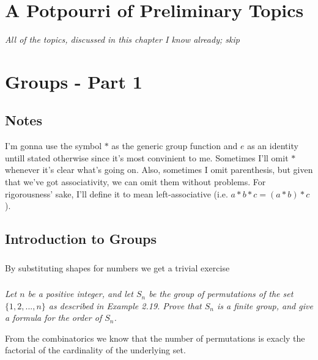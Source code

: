 \documentclass[11pt,oneside,titlepage]{book}
\newcommand{\set}[1]{\{ #1 \}}
\begin{document}
\chapter{A Potpourri of Preliminary Topics}

\textit{All of the topics, discussed in this chapter I know already; skip}

\chapter{Groups - Part 1}

\section*{Notes}

I'm gonna use the symbol $*$ as the generic group function and $e$ as
an identity untill stated otherwise since it's most convinient to me.
Sometimes I'll omit $*$ whenever it's clear what's going on. Also,
sometimes I omit parenthesis, but given that we've got associativity,
we can omit them without problems. For rigorousness' sake, I'll
define it to mean left-associative (i.e. $a * b * c = (a * b) * c$).

\section{Introduction to Groups}

\subsection{}

By substituting shapes for numbers we get a trivial exercise


\subsection{}

\textit{Let $n$ be a positive integer, and let $S_n$ be the group of
  permutations of the set $\set{1, 2, ... , n}$ as described in Example
  2.19. Prove that $S_n$ is a finite group, and give a formula for the
  order of $S_n$.}

From the combinatorics we know that the number of permutations is
exacly the factorial of the cardinality of the underlying set.

\subsection{}
\end{document}
